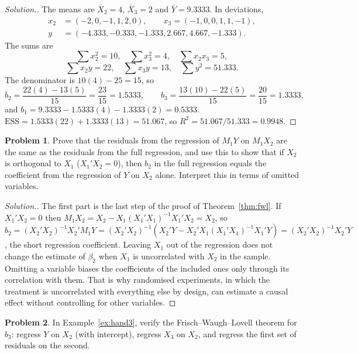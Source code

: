 \documentclass[11pt,a4paper]{article}
\numberwithin{equation}{section}
\theoremstyle{definition}
\newtheorem{problemx}{Problem}[subsection]
\newenvironment{problem}{\begin{problemx}}{\end{problemx}}
\newenvironment{solution}
  {\renewcommand{\qedsymbol}{}\begin{proof}[\textit{Solution}.]}
  {\end{proof}}
\begin{document}
\begin{solution}
The means are $\bar X_2 = 4$, $\bar X_3 = 2$ and $\bar Y = 9.3333$. In deviations,
\begin{align*}
x_2 &= (-2, 0, -1, 1, 2, 0), \qquad x_3 = (-1, 0, 0, 1, 1, -1),\\
y &= (-4.333, -0.333, -1.333, 2.667, 4.667, -1.333) .
\end{align*}
The sums are
\[
\sum x_2^2 = 10, \quad \sum x_3^2 = 4, \quad \sum x_2x_3 = 5,
\]
\[
\sum x_2y = 22, \quad \sum x_3y = 13, \quad \sum y^2 = 51.333 .
\]
The denominator is $10(4) - 25 = 15$, so
\[
b_2 = \frac{22(4) - 13(5)}{15} = \frac{23}{15} = 1.5333, \qquad b_3 = \frac{13(10) - 22(5)}{15} = \frac{20}{15} = 1.3333,
\]
and $b_1 = 9.3333 - 1.5333(4) - 1.3333(2) = 0.5333$. $\text{ESS} = 1.5333(22) + 1.3333(13) = 51.067$, so $R^2 = 51.067/51.333 = 0.9948$.
\end{solution}

\begin{problem}
Prove that the residuals from the regression of $M_1Y$ on $M_1X_2$ are the same as the residuals from the full regression, and use this to show
that if $X_2$ is orthogonal to $X_1$ ($X_1'X_2 = 0$), then $b_2$ in the full regression equals the coefficient from the regression of $Y$ on $X_2$ alone.
Interpret this in terms of omitted variables.
\end{problem}

\begin{solution}
The first part is the last step of the proof of Theorem~\ref{thm:fwl}. If $X_1'X_2 = 0$ then $M_1X_2 = X_2 - X_1(X_1'X_1)^{-1}X_1'X_2 = X_2$, so
$b_2 = (X_2'X_2)^{-1}X_2'M_1Y = (X_2'X_2)^{-1}(X_2'Y - X_2'X_1(X_1'X_1)^{-1}X_1'Y) = (X_2'X_2)^{-1}X_2'Y$, the short regression coefficient. Leaving $X_1$
out of the regression does not change the estimate of $\beta_2$ when $X_1$ is uncorrelated with $X_2$ in the sample. Omitting a variable biases the
coefficients of the included ones only through its correlation with them. That is why randomised experiments, in which the treatment is
uncorrelated with everything else by design, can estimate a causal effect without controlling for other variables.
\end{solution}

\begin{problem}
In Example~\ref{ex:hand3}, verify the Frisch--Waugh--Lovell theorem for $b_3$: regress $Y$ on $X_2$ (with intercept), regress $X_3$ on $X_2$, and
regress the first set of residuals on the second.
\end{problem}
\end{document}
